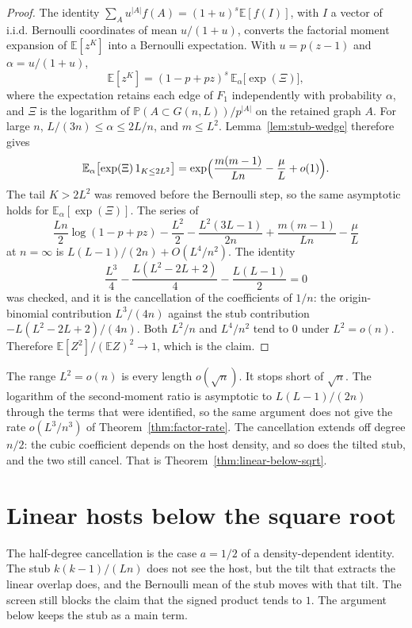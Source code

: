 \documentclass[11pt]{article}
\newcommand{\EE}{\mathbb{E}}
\newcommand{\PP}{\mathbb{P}}
\begin{document}
\begin{proof}
The identity \(\sum_A u^{|A|}f(A)=(1+u)^s\EE[f(I)]\), with \(I\) a vector of
i.i.d. Bernoulli coordinates of mean \(u/(1+u)\), converts the factorial
moment expansion of \(\EE[z^K]\) into a Bernoulli expectation. With
\(u=p(z-1)\) and \(\alpha=u/(1+u)\),
\[
\EE[z^K]=(1-p+pz)^s\,\EE_\alpha\bigl[\exp(\Xi)\bigr],
\]
where the expectation retains each edge of \(F_1\) independently with
probability \(\alpha\), and \(\Xi\) is the logarithm of
\(\PP(A\subset G(n,L))/p^{|A|}\) on the retained graph \(A\).
For large \(n\), \(L/(3n)\le\alpha\le 2L/n\), and \(m\le L^2\).
Lemma~\ref{lem:stub-wedge} therefore gives
\[
\EE_\alpha\bigl[\exp(\Xi)\,1_{K\le 2L^2}\bigr]
=\exp\Bigl(\frac{m(m-1)}{Ln}-\frac{\mu}{L}+o(1)\Bigr).
\]
The tail \(K>2L^2\) was removed before the Bernoulli step, so the same
asymptotic holds for \(\EE_\alpha[\exp(\Xi)]\).
The series of
\[
\frac{Ln}{2}\log(1-p+pz)-\frac{L^2}{2}-\frac{L^2(3L-1)}{2n}
+\frac{m(m-1)}{Ln}-\frac{\mu}{L}
\]
at \(n=\infty\) is \(L(L-1)/(2n)+O(L^4/n^2)\). The identity
\[
\frac{L^3}{4}-\frac{L(L^2-2L+2)}{4}-\frac{L(L-1)}{2}=0
\]
was checked, and it is the cancellation of the coefficients of \(1/n\): the
origin-binomial contribution \(L^3/(4n)\) against the stub contribution
\(-L(L^2-2L+2)/(4n)\). Both \(L^2/n\) and \(L^4/n^2\) tend to \(0\) under
\(L^2=o(n)\). Therefore \(\EE[Z^2]/(\EE Z)^2\to 1\), which is the
claim.
\end{proof}

The range \(L^2=o(n)\) is every length \(o(\sqrt{n})\). It stops short of \(\sqrt{n}\).
The logarithm of the second-moment ratio is asymptotic to \(L(L-1)/(2n)\)
through the terms that were identified, so the same argument does not give
the rate \(o(L^3/n^3)\) of Theorem~\ref{thm:factor-rate}.
The cancellation extends off degree \(n/2\): the cubic coefficient depends on
the host density, and so does the tilted stub, and the two still cancel.
That is Theorem~\ref{thm:linear-below-sqrt}.

\section{Linear hosts below the square root}
\label{sec:linear-below-sqrt}

The half-degree cancellation is the case \(a=1/2\) of a density-dependent
identity. The stub \(k(k-1)/(Ln)\) does not see the host, but the tilt that
extracts the linear overlap does, and the Bernoulli mean of the stub moves
with that tilt. The screen still blocks the claim that the signed product
tends to \(1\). The argument below keeps the stub as a main term.
\end{document}
